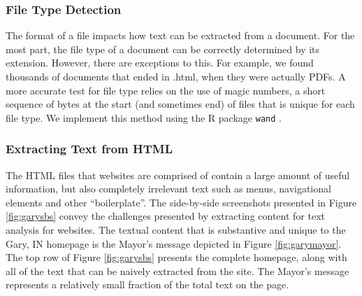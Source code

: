 \documentclass[11pt]{article}
\begin{document}
\subsubsection{File Type Detection}
The format of a file impacts how text can be extracted from a document. For the most part, the file type of a document can be correctly determined by its extension. However, there are exceptions to this. For example, we found thousands of documents that ended in .html, when they were actually PDFs. A more accurate test for file type relies on the use of magic numbers, a short sequence of bytes at the start (and sometimes end) of files that is unique for each file type. We implement this method using the R package \texttt{wand} \citep{wand}.%

\subsubsection{Extracting Text from HTML}
The HTML files that websites are comprised of contain a large amount of useful information, but also completely irrelevant text such as menus, navigational elements and other ``boilerplate''. The side-by-side screenshots presented in Figure \ref{fig:garysbs} convey the challenges presented by extracting content for text analysis for websites. The textual content that is substantive and unique to the Gary, IN homepage is the Mayor's message depicted in Figure \ref{fig:garymayor}. The top row of Figure \ref{fig:garysbs} presents the complete homepage, along with all of the text that can be naively extracted from the site. The Mayor's message represents a relatively small fraction of the total text on the page.
\end{document}
